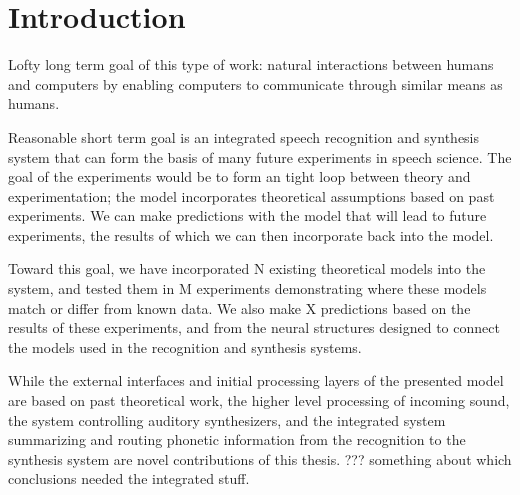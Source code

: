 \chapter{Introduction}



Lofty long term goal of this type of work:
natural interactions between humans and computers
by enabling computers to communicate through
similar means as humans.

Reasonable short term goal is an integrated
speech recognition and synthesis system
that can form the basis of many future
experiments in speech science.
The goal of the experiments would be to
form an tight loop between
theory and experimentation;
the model incorporates theoretical
assumptions based on past experiments.
We can make predictions with the model
that will lead to future experiments,
the results of which we can then
incorporate back into the model.

Toward this goal,
we have incorporated N existing
theoretical models into the system,
and tested them in M experiments
demonstrating where these models
match or differ from known data.
We also make X predictions
based on the results of these experiments,
and from the neural structures
designed to connect
the models used in the recognition
and synthesis systems.

While the external interfaces
and initial processing layers of
the presented model are based on
past theoretical work,
the higher level processing
of incoming sound,
the system controlling
auditory synthesizers,
and the integrated system
summarizing and routing
phonetic information from
the recognition to the synthesis system
are novel contributions of this thesis.
??? something about which conclusions
needed the integrated stuff.
